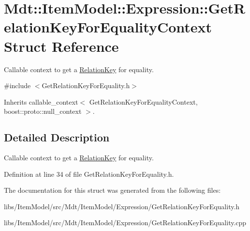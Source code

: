 \hypertarget{struct_mdt_1_1_item_model_1_1_expression_1_1_get_relation_key_for_equality_context}{}\section{Mdt\+:\+:Item\+Model\+:\+:Expression\+:\+:Get\+Relation\+Key\+For\+Equality\+Context Struct Reference}
\label{struct_mdt_1_1_item_model_1_1_expression_1_1_get_relation_key_for_equality_context}


Callable context to get a \hyperlink{class_mdt_1_1_item_model_1_1_relation_key}{Relation\+Key} for equality.  




{\ttfamily \#include $<$Get\+Relation\+Key\+For\+Equality.\+h$>$}



Inherits callable\+\_\+context$<$ Get\+Relation\+Key\+For\+Equality\+Context, boost\+::proto\+::null\+\_\+context $>$.



\subsection{Detailed Description}
Callable context to get a \hyperlink{class_mdt_1_1_item_model_1_1_relation_key}{Relation\+Key} for equality. 

Definition at line 34 of file Get\+Relation\+Key\+For\+Equality.\+h.



The documentation for this struct was generated from the following files\+:\begin{DoxyCompactItemize}
\item 
libs/\+Item\+Model/src/\+Mdt/\+Item\+Model/\+Expression/Get\+Relation\+Key\+For\+Equality.\+h\item 
libs/\+Item\+Model/src/\+Mdt/\+Item\+Model/\+Expression/Get\+Relation\+Key\+For\+Equality.\+cpp\end{DoxyCompactItemize}
